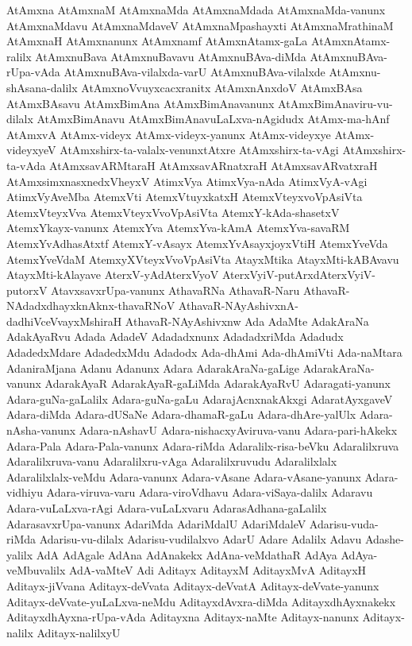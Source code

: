 {AtAmxna
AtAmxnaM
AtAmxnaMda
AtAmxnaMdada
AtAmxnaMda-vanunx
AtAmxnaMdavu
AtAmxnaMdaveV
AtAmxnaMpashayxti
AtAmxnaMrathinaM
AtAmxnaH
AtAmxnanunx
AtAmxnamf
AtAmxnAtamx-gaLa
AtAmxnAtamx-ralilx
AtAmxnuBava
AtAmxnuBavavu
AtAmxnuBAva-diMda
AtAmxnuBAva-rUpa-vAda
AtAmxnuBAva-vilalxda-varU
AtAmxnuBAva-vilalxde
AtAmxnu-shAsana-dalilx
AtAmxnoVvuyxcacxranitx
AtAmxnAnxdoV
AtAmxBAsa
AtAmxBAsavu
AtAmxBimAna
AtAmxBimAnavanunx
AtAmxBimAnaviru-vu-dilalx
AtAmxBimAnavu
AtAmxBimAnavuLaLxva-nAgidudx
AtAmx-ma-hAnf
AtAmxvA
AtAmx-videyx
AtAmx-videyx-yanunx
AtAmx-videyxye
AtAmx-videyxyeV
AtAmxshirx-ta-valalx-venunxtAtxre
AtAmxshirx-ta-vAgi
AtAmxshirx-ta-vAda
AtAmxsavARMtaraH
AtAmxsavARnatxraH
AtAmxsavARvatxraH
AtAmxsimxnasxnedxVheyxV
AtimxVya
AtimxVya-nAda
AtimxVyA-vAgi
AtimxVyAveMba
AtemxVti
AtemxVtuyxkatxH
AtemxVteyxvoVpAsiVta
AtemxVteyxVva
AtemxVteyxVvoVpAsiVta
AtemxY-kAda-shasetxV
AtemxYkayx-vanunx
AtemxYva
AtemxYva-kAmA
AtemxYva-savaRM
AtemxYvAdhasAtxtf
AtemxY-vAsayx
AtemxYvAsayxjoyxVtiH
AtemxYveVda
AtemxYveVdaM
AtemxyXVteyxVvoVpAsiVta
AtayxMtika
AtayxMti-kABAvavu
AtayxMti-kAlayave
AterxV-yAdAterxVyoV
AterxVyiV-putArxdAterxVyiV-putorxV
AtavxsavxrUpa-vanunx
AthavaRNa
AthavaR-Naru
AthavaR-NAdadxdhayxknAknx-thavaRNoV
AthavaR-NAyAshivxnA-dadhiVceVvayxMshiraH
AthavaR-NAyAshivxnw
Ada
AdaMte
AdakAraNa
AdakAyaRvu
Adada
AdadeV
Adadadxnunx
AdadadxriMda
Adadudx
AdadedxMdare
AdadedxMdu
Adadodx
Ada-dhAmi
Ada-dhAmiVti
Ada-naMtara
AdaniraMjana
Adanu
Adanunx
Adara
AdarakAraNa-gaLige
AdarakAraNa-vanunx
AdarakAyaR
AdarakAyaR-gaLiMda
AdarakAyaRvU
Adaragati-yanunx
Adara-guNa-gaLalilx
Adara-guNa-gaLu
AdarajAcnxnakAkxgi
AdaratAyxgaveV
Adara-diMda
Adara-dUSaNe
Adara-dhamaR-gaLu
Adara-dhAre-yalUlx
Adara-nAsha-vanunx
Adara-nAshavU
Adara-nishacxyAviruva-vanu
Adara-pari-hAkekx
Adara-Pala
Adara-Pala-vanunx
Adara-riMda
Adaralilx-risa-beVku
Adaralilxruva
Adaralilxruva-vanu
Adaralilxru-vAga
Adaralilxruvudu
Adaralilxlalx
Adaralilxlalx-veMdu
Adara-vanunx
Adara-vAsane
Adara-vAsane-yanunx
Adara-vidhiyu
Adara-viruva-varu
Adara-viroVdhavu
Adara-viSaya-dalilx
Adaravu
Adara-vuLaLxva-rAgi
Adara-vuLaLxvaru
AdarasAdhana-gaLalilx
AdarasavxrUpa-vanunx
AdariMda
AdariMdalU
AdariMdaleV
Adarisu-vuda-riMda
Adarisu-vu-dilalx
Adarisu-vudilalxvo
AdarU
Adare
Adalilx
Adavu
Adashe-yalilx
AdA
AdAgale
AdAna
AdAnakekx
AdAna-veMdathaR
AdAya
AdAya-veMbuvalilx
AdA-vaMteV
Adi
Aditayx
AditayxM
AditayxMvA
AditayxH
Aditayx-jiVvana
Aditayx-deVvata
Aditayx-deVvatA
Aditayx-deVvate-yanunx
Aditayx-deVvate-yuLaLxva-neMdu
AditayxdAvxra-diMda
AditayxdhAyxnakekx
AditayxdhAyxna-rUpa-vAda
Aditayxna
Aditayx-naMte
Aditayx-nanunx
Aditayx-nalilx
Aditayx-nalilxyU
}

